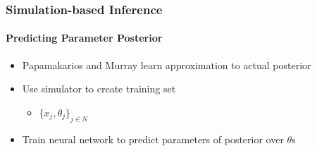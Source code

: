 \documentclass[9pt]{beamer}
\begin{document}
\begin{frame}
\frametitle{Simulation-based Inference}
\framesubtitle{Predicting Parameter Posterior}
\begin{itemize}
	\item Papamakarios and Murray \cite{papamakarios2016fast} learn approximation to actual posterior
	\item Use simulator to create training set
	\begin{itemize}
		\item $\lbrace x_j, \theta_j \rbrace_{j \in N}$
	\end{itemize}
	\item Train neural network to predict parameters of posterior over $\theta$s 
\end{itemize}
\end{frame} 
\end{document}
